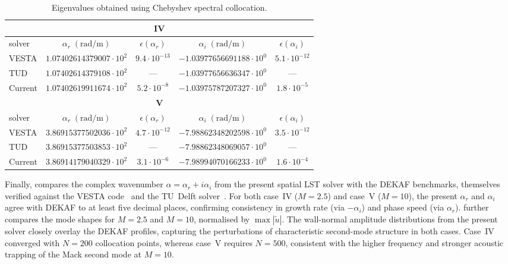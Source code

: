 \begin{table}[H]
  \centering
  \caption{Eigenvalues obtained using Chebyshev spectral collocation.}
  \label{tab:eigs_iv_v}
  \setlength{\tabcolsep}{7pt}
  \begin{tabular}{@{}lcccc@{}}
    \toprule
    \multicolumn{5}{c}{\textbf{IV}}\\
    \midrule
    solver & $\alpha_r\;(\mathrm{rad/m})$ & $\epsilon(\alpha_r)$
           & $\alpha_i\;(\mathrm{rad/m})$ & $\epsilon(\alpha_i)$ \\
    \midrule
    VESTA   & $1.07402614379007\cdot 10^{2}$ & $9.4\cdot 10^{-13}$ &
               $-1.03977656691188\cdot 10^{0}$ & $5.1\cdot 10^{-12}$ \\
    TUD     & $1.07402614379108\cdot 10^{2}$ & --- &
               $-1.03977656636347\cdot 10^{0}$ & --- \\
    Current & $1.07402619911674\cdot 10^{2}$  & $5.2\cdot 10^{-8}$ &
               $-1.03975787207327\cdot 10^{0}$ & $1.8\cdot 10^{-5}$ \\
    \midrule
    \multicolumn{5}{c}{\textbf{V}}\\
    \midrule
    solver & $\alpha_r\;(\mathrm{rad/m})$ & $\epsilon(\alpha_r)$
           & $\alpha_i\;(\mathrm{rad/m})$ & $\epsilon(\alpha_i)$ \\
    \midrule
    VESTA   & $3.86915377502036\cdot 10^{2}$ & $4.7\cdot 10^{-12}$ &
               $-7.98862348202598\cdot 10^{0}$ & $3.5\cdot 10^{-12}$ \\
    TUD     & $3.86915377503853\cdot 10^{2}$ & --- &
               $-7.98862348069057\cdot 10^{0}$ & --- \\
    Current & $3.86914179040329\cdot 10^{2}$  & $3.1\cdot 10^{-6}$ &
               $-7.98994070166233\cdot 10^{0}$ & $1.6\cdot 10^{-4}$ \\
    \bottomrule
  \end{tabular}
\end{table}

Finally,  compares the complex wavenumber $\alpha=\alpha_r+i\alpha_i$ from the present spatial \gls{LST} solver with the DEKAF benchmarks, themselves verified against the VESTA code~\citep{Pinna2012} and the TU~Delft solver~\citep{Groot2013}. For both case~IV ($M=2.5$) and case~V ($M=10$), the present $\alpha_r$ and $\alpha_i$ agree with DEKAF to at least five decimal places, confirming consistency in growth rate (via $-\alpha_i$) and phase speed (via $\alpha_r$).  further compares the mode shapes for $M=2.5$ and $M=10$, normalised by $\max|\tilde{u}|$. The wall-normal amplitude distributions from the present solver closely overlay the DEKAF profiles, capturing the perturbations of characteristic second-mode structure in both cases. Case~IV converged with $N=200$ collocation points, whereas case~V requires $N=500$, consistent with the higher frequency and stronger acoustic trapping of the Mack second mode at $M=10$.


